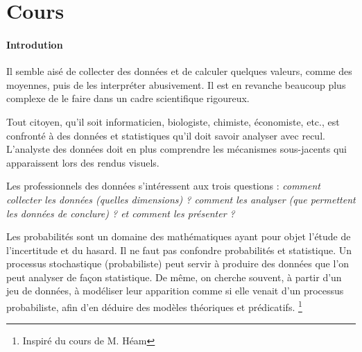 \documentclass[10pt, a4paper]{article}
\begin{document}



\newpage
\normalsize
\section{Cours}
\paragraph{Introdution}
Il semble aisé de collecter des données et de calculer quelques valeurs, comme des moyennes, 
puis de les interpréter abusivement. Il est en revanche beaucoup plus complexe de le faire dans un cadre scientifique rigoureux.

 Tout citoyen, qu’il soit informaticien, biologiste, chimiste, économiste, etc., est confronté à des données et statistiques qu’il doit savoir analyser avec recul. L'analyste des données doit en plus comprendre les mécanismes sous-jacents qui apparaissent lors des rendus visuels. 

Les professionnels des données s'intéressent aux trois questions :\textit{ comment collecter les données (quelles dimensions) ? comment les analyser (que permettent les données de conclure) ? et comment les présenter ?}


Les probabilités sont un domaine des mathématiques ayant pour objet l’étude de l’incertitude et du hasard. Il
ne faut pas confondre probabilités et statistique. Un processus stochastique (probabiliste) peut servir à produire des
données que l’on peut analyser de façon statistique. De même, on cherche souvent, à partir d’un jeu de données, à
modéliser leur apparition comme si elle venait d’un processus probabiliste, afin d’en déduire des modèles théoriques
et prédicatifs. \footnote{Inspiré du cours de M. Héam}
\end{document}
